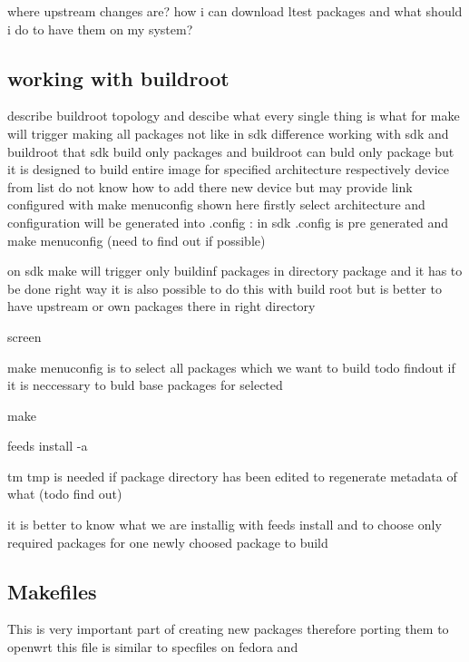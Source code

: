 where upstream changes are? how i can download ltest packages and what should i do to have them on my system?

\subsection{working with buildroot}

describe buildroot topology and descibe what every single thing is what for
make will trigger making all packages not like in sdk
difference working with sdk and buildroot that sdk build only packages and buildroot can buld only package but it is designed to build entire image
for specified architecture respectively device from list
do not know how to add there new device but may provide link
configured with make menuconfig shown here firstly select architecture and configuration will be generated into .config :
in sdk .config is pre generated and make menuconfig (need to find out if possible)

on sdk make will trigger only buildinf packages in directory package and it has to be done right way
it is also possible to do this with build root but is better to have upstream or own packages there in right directory

screen

make menuconfig is to select all packages which we want to build  todo findout if it is neccessary to buld base packages for selected

make

feeds install -a

tm tmp is needed if package directory has been edited to regenerate metadata of what (todo find out)

it is better to know what we are installig with feeds install and to choose only required packages for one newly choosed package to build

\subsection{Makefiles}

This is very important part of creating new packages therefore porting them to openwrt this file is similar to specfiles on fedora and
